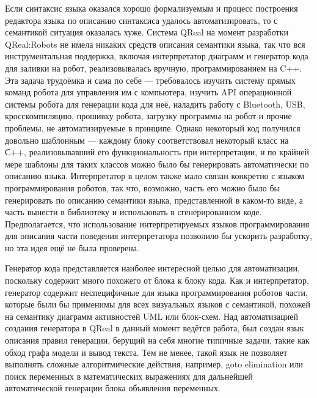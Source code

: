 \documentclass[a4paper]{article}
\begin{document}
Если синтаксис языка оказался хорошо формализуемым и процесс построения редактора языка по описанию синтаксиса удалось автоматизировать, то с семантикой ситуация оказалась хуже. Система QReal на момент разработки QReal:Robots не имела никаких средств описания семантики языка, так что вся инструментальная поддержка, включая интерпретатор диаграмм и генератор кода для заливки на робот, реализовывалась вручную, программированием на C++. Эта задача трудоёмка и сама по себе --- требовалось изучить систему прямых команд робота для управления им с компьютера, изучить API операционной системы робота для генерации кода для неё, наладить работу с Bluetooth, USB, кросскомпиляцию, прошивку робота, загрузку программы на робот и прочие проблемы, не автоматизируемые в принципе. Однако  некоторый код получился довольно шаблонным --- каждому блоку соответствовал некоторый класс на С++, реализовывавший его функциональность при интерпретации, и по крайней мере шаблоны для таких классов можно было бы генерировать автоматически по описанию языка. Интерпретатор в целом также мало связан конкретно с языком программирования роботов, так что, возможно, часть его можно было бы генерировать по описанию семантики языка, представленной в каком-то виде, а часть вынести в библиотеку и использовать в сгенерированном коде. Предполагается, что использование интерпретируемых языков программирования для описания части поведения интерпретатора позволило бы ускорить разработку, но эта идея ещё не была проверена.

Генератор кода представляется наиболее интересной целью для автоматизации, поскольку содержит много похожего от блока к блоку кода. Как и интерпретатор, генератор содержит неспецифичные для языка программирования роботов части, которые были бы применимы для всех визуальных языков с семантикой, похожей на семантику диаграмм активностей UML или блок-схем. Над автоматизацией создания генератора в QReal в данный момент ведётся работа, был создан язык описания правил генерации, берущий на себя многие типичные задачи, такие как обход графа модели и вывод текста. Тем не менее, такой язык не позволяет выполнять сложные алгоритмические действия, например, goto elimination или поиск переменных в математических выражениях для дальнейшей автоматической генерации блока объявления переменных.
\end{document}
